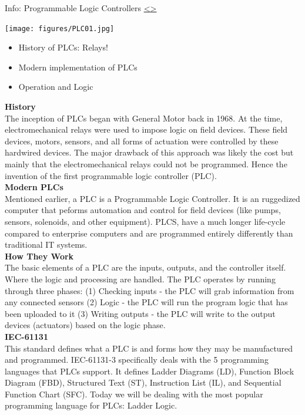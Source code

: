 \documentclass[12pt]{extarticle}
\newenvironment{instructionblock}{\Large\bgroup}{\egroup}
\newcommand{\bi}{\begin{itemize}}
\newcommand{\ei}{\end{itemize}}
\newcounter{next}
\newcounter{prev}
\begin{document}

\pagebreak
{}
\begin{slide}{Info: Programmable Logic Controllers }{\hyperref[slide \theprev]{\textless}\hyperref[slide \thenext]{\textgreater}}
\begin{instructionblock}
	\begin{center}
		\texttt{[image: figures/PLC01.jpg]}
	\end{center}
\bi
	\item History of PLCs: Relays!
	\item Modern implementation of PLCs
	\item Operation and Logic
\ei
\end{instructionblock}
\end{slide}
\vfill
\noindent
\textbf{History}\\
The inception of PLCs began with General Motor back in 1968. At the time, electromechanical relays were used to impose logic on field devices. These field devices, motors, sensors, and all forms of actuation were controlled by these hardwired devices. The major drawback of this approach was likely the cost but mainly that the electromechanical relays could not be programmed. Hence the invention of the first programmable logic controller (PLC). \cite[p.123]{KnappLangill} \\
\textbf{Modern PLCs}\\
Mentioned earlier, a PLC is a Programmable Logic Controller. It is an ruggedized computer that peforms automation and control for field devices (like pumps, sensors, solenoids, and other equipment). PLCS, have a much longer life-cycle compared to enterprise computers and are programmed entirely differently than traditional IT systems. \cite[p.123]{KnappLangill} \\
\textbf{How They Work}\\
The basic elements of a PLC are the inputs, outputs, and the controller itself. Where the logic and processing are handled. The PLC operates by running through three phases: (1) Checking inputs - the PLC will grab information from any connected sensors (2) Logic - the PLC will run the program logic that has been uploaded to it (3) Writing outputs - the PLC will write to the output devices (actuators) based on the logic phase. \cite{OP_plcs}\\
\textbf{IEC-61131}\\
This standard defines what a PLC is and forms how they may be manufactured and programmed. IEC-61131-3 specifically deals with the 5 programming languages that PLCs support. It defines Ladder Diagrams (LD), Function Block Diagram (FBD), Structured Text (ST), Instruction List (IL), and Sequential Function Chart (SFC). Today we will be dealing with the most popular programming language for PLCs: Ladder Logic.
\end{document}
